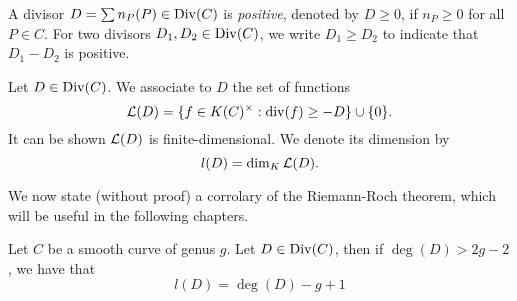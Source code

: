 \begin{definition}
	A divisor $D = \sum n_P(P) \in \operatorname{Div}(C)$ is \emph{positive}, denoted by
	$D \geq 0$, if $n_P \geq 0$ for all $P \in C$.
	For two divisors $D_1, D_2 \in \operatorname{Div}(C)$, we write $D_1 \geq D_2$
	to indicate that $D_1 - D_2$ is positive.
\end{definition}

\begin{definition}
	Let $D \in \operatorname{Div}(C)$. We associate to $D$ the set of functions
	\begin{equation*}
		\mathcal{L}(D) = \{f \in K(C)^\times: \operatorname{div}(f) \geq -D\} \cup \{ 0 \}.
	\end{equation*}
	It can be shown $\mathcal{L}(D)$ is finite-dimensional. We denote its dimension by
	\begin{equation*}
		l(D) = \dim_K \mathcal{L}(D).
	\end{equation*}
\end{definition}

We now state (without proof) a corrolary of the Riemann-Roch theorem, which will be
useful in the following chapters.

\begin{theorem}
	\label{thm:riemann-roch}
	Let $C$ be a smooth curve of genus $g$. Let $D \in \operatorname{Div}(C)$, then if
	$\deg(D) > 2g - 2$, we have that
	\begin{equation*}
		l(D) = \deg(D) - g + 1
	\end{equation*}
\end{theorem}
